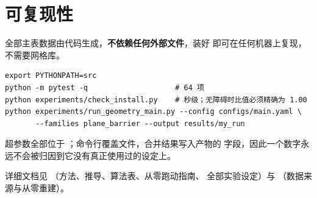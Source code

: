 \documentclass[11pt,a4paper]{article}
\begin{document}
\section{可复现性}

全部主表数据由代码生成，\textbf{不依赖任何外部文件}，装好
 即可在任何机器上复现，不需要网格库。

\begin{verbatim}
export PYTHONPATH=src
python -m pytest -q                    # 64 项
python experiments/check_install.py    # 秒级；无障碍时比值必须精确为 1.00
python experiments/run_geometry_main.py --config configs/main.yaml \
       --families plane_barrier --output results/my_run
\end{verbatim}

超参数全部位于 ；命令行覆盖文件，合并结果写入产物的
 字段，因此一个数字永远不会被归因到它没有真正使用过的设定上。

详细文档见 （方法、推导、算法表、从零跑动指南、
全部实验设定）与 （数据来源与从零重建）。
\end{document}
